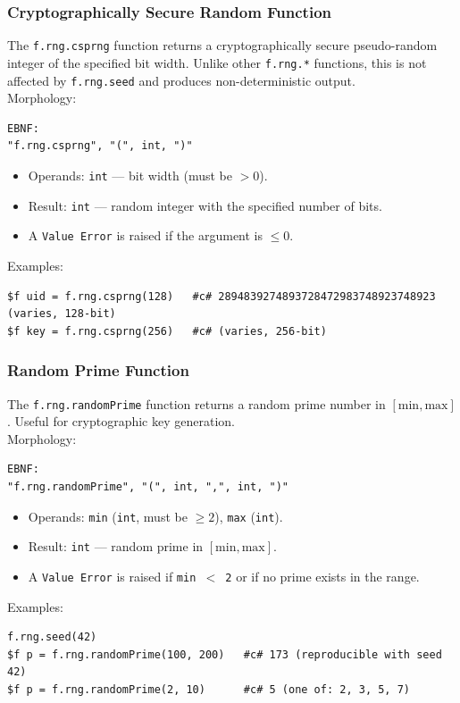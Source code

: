 \subsubsection{Cryptographically Secure Random Function}
The \texttt{f.rng.csprng} function returns a cryptographically secure pseudo-random integer of the specified bit width. Unlike other \texttt{f.rng.*} functions, this is not affected by \texttt{f.rng.seed} and produces non-deterministic output. \\
Morphology:
\begin{verbatim}
EBNF:
"f.rng.csprng", "(", int, ")"
\end{verbatim}
\begin{itemize}
\item Operands: \texttt{int} --- bit width (must be $> 0$).
\item Result: \texttt{int} --- random integer with the specified number of bits.
\item A \texttt{Value Error} is raised if the argument is $\leq 0$.
\end{itemize}
Examples:
\begin{verbatim}
$f uid = f.rng.csprng(128)   #c# 2894839274893728472983748923748923 (varies, 128-bit)
$f key = f.rng.csprng(256)   #c# (varies, 256-bit)
\end{verbatim}

\subsubsection{Random Prime Function}
The \texttt{f.rng.randomPrime} function returns a random prime number in $[\text{min}, \text{max}]$. Useful for cryptographic key generation. \\
Morphology:
\begin{verbatim}
EBNF:
"f.rng.randomPrime", "(", int, ",", int, ")"
\end{verbatim}
\begin{itemize}
\item Operands: \texttt{min} (\texttt{int}, must be $\geq 2$), \texttt{max} (\texttt{int}).
\item Result: \texttt{int} --- random prime in $[\text{min}, \text{max}]$.
\item A \texttt{Value Error} is raised if \texttt{min $<$ 2} or if no prime exists in the range.
\end{itemize}
Examples:
\begin{verbatim}
f.rng.seed(42)
$f p = f.rng.randomPrime(100, 200)   #c# 173 (reproducible with seed 42)
$f p = f.rng.randomPrime(2, 10)      #c# 5 (one of: 2, 3, 5, 7)
\end{verbatim}

